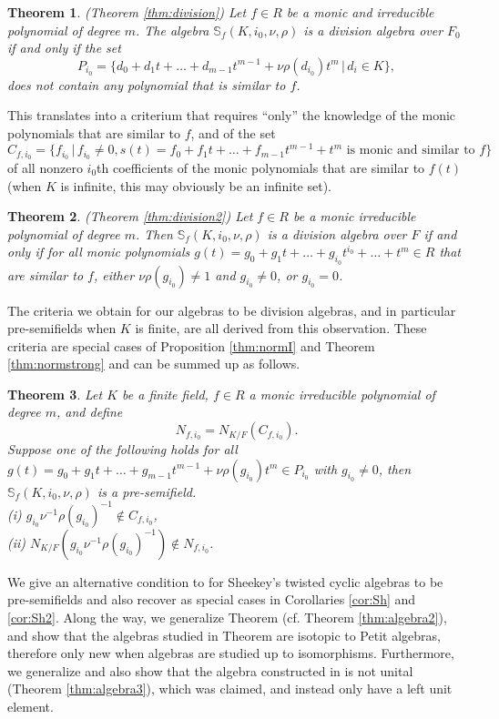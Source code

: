 \documentclass[12pt]{amsart}
\theoremstyle{plain}
\newtheorem*{theorem*}{Theorem}
\theoremstyle{definition}
\numberwithin{equation}{section}
\numberwithin{figure}{section}
\begin{document}
\begin{theorem*} (Theorem \ref{thm:division})
Let $f\in R$ be a monic and irreducible polynomial of degree $m$.
The algebra $\mathbb{S}_f(K,i_0,\nu,\rho)$  is a division algebra over $F_0$ if and only if the set
 $$P_{i_0}=\lbrace d_0+d_1t+\dots+d_{m-1}t^{m-1}+\nu\rho(d_{i_0})t^{m}\,|\, d_i\in K \rbrace,$$ does not contain any polynomial that is similar to $f$.
\end{theorem*}

This translates into a criterium that  requires ``only'' the knowledge of the monic polynomials that are similar to $f$, and of the set
$$C_{f,{i_0}}=\{ f_{i_0}\,|\, f_{i_0}\not=0, s (t)=f_0+f_1t+\dots+f_{m-1}t^{m-1}+t^m \text{ is monic and similar to } f\}$$
of all nonzero $i_{0}$th coefficients of the monic polynomials that are similar to $f(t)$ (when $K$ is infinite, this may obviously be an infinite set).

\begin{theorem*} (Theorem \ref{thm:division2})
Let $f\in R$ be a monic irreducible polynomial of degree $m$. Then
$\mathbb{S}_f(K,i_0,\nu,\rho)$  is a division algebra over $F$ if and only if  for all
 monic polynomials  $g(t)=g_0+g_1t+\dots+ g_{i_0}t^{i_0}+\dots +t^m\in R$ that are similar to $f$, either $\nu\rho(g_{i_0})\not =1$ and $g_{i_0}\not=0$, or $g_{i_0}=0$.
\end{theorem*}

 The criteria we obtain for our algebras to be division algebras, and in particular pre-semifields when $K$ is finite, are all derived from this observation.
 These criteria are special cases of Proposition \ref{thm:normI} and Theorem \ref{thm:normstrong} and can be summed up as follows.

 \begin{theorem*}
 Let $K$ be a finite field,  $f\in R$  a monic irreducible polynomial of degree $m$, and define
 $$N_{f,{i_0}}=N_{K/F}(C_{f,{i_0}}).$$
 Suppose one of the following holds for all $g(t)=g_0+g_1t+\dots+g_{m-1}t^{m-1}+\nu\rho(g_{i_0})t^m\in P_{i_0}$ with $g_{i_0}\not=0$, then $\mathbb{S}_f(K,i_0,\nu,\rho)$ is a pre-semifield.
\\ (i)
$ g_{i_0}\nu^{-1}\rho(g_{i_0})^{-1}\not \in C_{f,{i_0}}$,
 \\ (ii) $ N_{K/F}(g_{i_0}\nu^{-1}\rho(g_{i_0})^{-1})\not\in N_{f,{i_0}}$.
\end{theorem*}


 We  give an alternative condition to  \cite[Theorem 7]{Sheekey} for Sheekey's twisted cyclic algebras to be pre-semifields and also recover \cite[Theorem 7]{Sheekey} as special cases in
 Corollaries \ref{cor:Sh} and \ref{cor:Sh2}.
 Along the way,
 we generalize Theorem \cite[Theorem 5.4]{NewS} (cf. Theorem \ref{thm:algebra2}), and show that the algebras studied in Theorem \cite[Theorem 5.4]{NewS} are isotopic to Petit algebras, therefore only new when algebras are studied up to isomorphisms. Furthermore,
 we generalize \cite[Theorem 5.7]{NewS} and also show that the algebra constructed in \cite[Theorem 5.7]{NewS} is not unital (Theorem \ref{thm:algebra3}), which was claimed, and instead only have a left unit element.
\end{document}
